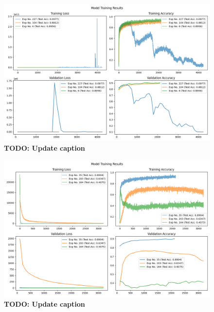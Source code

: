 \documentclass[11pt]{amsart}
\begin{document}
\begin{figure}[h]
	\centering
	\includegraphics[width=.9\textwidth]{../visualizations/model_training_results_vis_1.png}
 	\caption{\textbf{TODO: Update caption}}\label{fig:f2}
\end{figure}

\begin{figure}[h]
	\centering
	\includegraphics[width=.9\textwidth]{../visualizations/model_training_results_vis_2.png}
 	\caption{\textbf{TODO: Update caption}}\label{fig:f3}
\end{figure}

\end{document}
